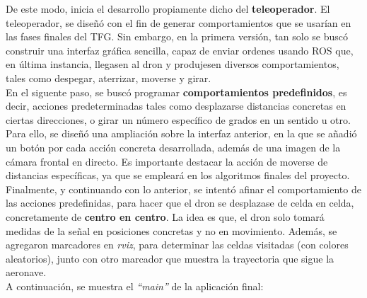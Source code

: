 De este modo, inicia el desarrollo propiamente dicho del \textbf{teleoperador}. El teleoperador, se diseñó con el fin de generar comportamientos que se usarían en las fases finales del \ac{TFG}. Sin embargo, en la primera versión, tan solo se buscó construir una interfaz gráfica sencilla, capaz de enviar ordenes usando \ac{ROS} que, en última instancia, llegasen al dron y produjesen diversos comportamientos, tales como despegar, aterrizar, moverse y girar.\\

En el siguente paso, se buscó programar \textbf{comportamientos predefinidos}, es decir, acciones predeterminadas tales como desplazarse distancias concretas en ciertas direcciones, o girar un número específico de grados en un sentido u otro. Para ello, se diseñó una ampliación sobre la interfaz anterior, en la que se añadió un botón por cada acción concreta desarrollada, además de una imagen de la cámara frontal en directo. Es importante destacar la acción de moverse de distancias específicas, ya que se empleará en los algoritmos finales del proyecto.\\

Finalmente, y continuando con lo anterior, se intentó afinar el comportamiento de las acciones predefinidas, para hacer que el dron se desplazase de celda en celda, concretamente de \textbf{centro en centro}. La idea es que, el dron solo tomará medidas de la señal en posiciones concretas y no en movimiento. Además, se agregaron marcadores en \emph{rviz}, para determinar las celdas visitadas (con colores aleatorios), junto con otro marcador que muestra la trayectoria que sigue la aeronave.\\

A continuación, se muestra el \emph{``main''} de la aplicación final:\\

